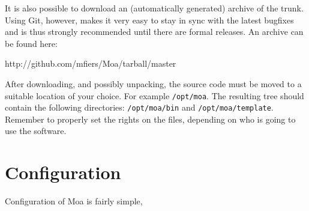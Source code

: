 It is also possible to download an (automatically generated) archive
of the trunk. Using Git, however, makes it very easy to stay in sync
with the latest bugfixes and is thus strongly recommended until there
are formal releases. An archive can be found here:

\begin{bash}
http://github.com/mfiers/Moa/tarball/master
\end{bash}

After downloading, and possibly unpacking, the source code must be
moved to a suitable location of your choice. For example
\lstinline!/opt/moa!. The resulting tree should contain the following
directories: \lstinline!/opt/moa/bin! and
\lstinline!/opt/moa/template!. Remember to properly set the rights on
the files, depending on who is going to use the software.

\section{Configuration}

Configuration of Moa is fairly simple, 

